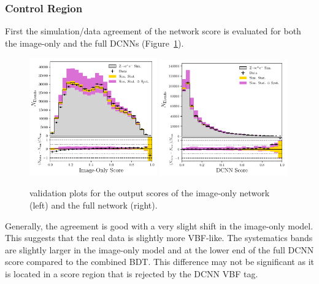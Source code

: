 \subsubsection{\Zee Control Region}
First the simulation/data agreement of the network score is evaluated for both the image-only and the full DCNNs (Figure~\ref{fig:event_categorisation:int_score_zee}). 
\begin{figure}[h!]
    \begin{center}
        \includegraphics[width=0.49\textwidth]{figures/event_selection/img_score_zee_LPS.pdf}
        \includegraphics[width=0.49\textwidth]{figures/event_selection/int_score_zee_LPS.pdf}
    \end{center}
    \caption{\Zee validation plots for the output scores of the image-only network (left) and the full network (right).}
    \label{fig:event_categorisation:int_score_zee}
\end{figure}

Generally, the agreement is good with a very slight shift in the image-only model. This suggests that the real data is slightly more VBF-like. 
The systematics bands are slightly larger in the image-only model and at the lower end of the full DCNN score compared to the combined BDT. This difference may not be significant as it is located in a score region that is rejected by the DCNN VBF tag.  


